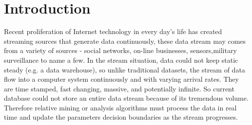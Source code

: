 \section{Introduction}
\label{introduction}

Recent  proliferation  of  Internet  technology  in
every  day's life  has  created  streaming  sources  that 
generate  data continuously, these data stream may comes from  a
variety of sources - social networks, on-line businesses, 
sensors,military surveillance to name a few. In the stream 
situation, data could not keep static steady (e.g. a data 
warehouse), so unlike traditional datasets, the stream of data 
flow into a computer system continuously and with varying 
arrival rates. They are time stamped, fast changing, massive, 
and potentially infinite. So current database could not store an 
entire data stream because of its tremendous volume. Therefore 
relative mining or analysis algorithms must process the data in 
real time and update the parameters decision boundaries as the 
stream progresses. 

